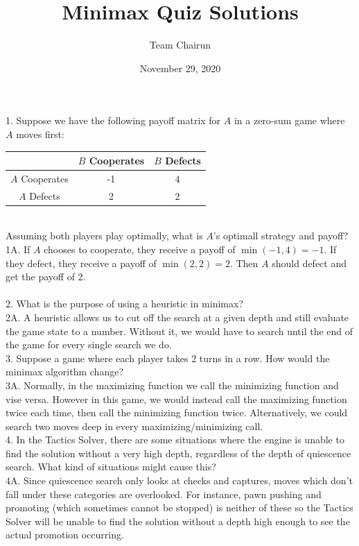 \documentclass[12pt, letterpaper]{article}
\title{Minimax Quiz Solutions}
\author{Team Chairun}
\date{November 29, 2020}
\begin{document}
\maketitle

1. Suppose we have the following payoff matrix for $A$ in a zero-sum game where $A$ moves first: \\
\begin{tabular}{|c|c|c|}
    \hline
    & $B$ Cooperates & $B$ Defects \\
    \hline
    $A$ Cooperates & -1 & 4 \\
    \hline
    $A$ Defects & 2 & 2 \\
    \hline
\end{tabular} \\
Assuming both players play optimally, what is $A$'s optimall strategy and payoff? \\
1A. If $A$ chooses to cooperate, they receive a payoff of $\min(-1, 4) = -1$. If they defect, they receive a payoff of $\min(2, 2) = 2$. Then $A$ should defect and get the payoff of $2$. \\\\
2. What is the purpose of using a heuristic in minimax? \\
2A. A heuristic allows us to cut off the search at a given depth and still evaluate the game state to a number. Without it, we would have to search until the end of the game for every single search we do. \\

3. Suppose a game where each player takes 2 turns in a row. How would the minimax algorithm change? \\
3A. Normally, in the maximizing function we call the minimizing function and vise versa. However in this game, we would instead call the maximizing function twice each time, then call the minimizing function twice. Alternatively, we could search two moves deep in every maximizing/minimizing call. \\

4. In the Tactics Solver, there are some situations where the engine is unable to find the solution without a very high depth, regardless of the depth of quiescence search. What kind of situations might cause this? \\
4A. Since quiescence search only looks at checks and captures, moves which don't fall under these categories are overlooked. For instance, pawn pushing and promoting (which sometimes cannot be stopped) is neither of these so the Tactics Solver will be unable to find the solution without a depth high enough to see the actual promotion occurring. \\
\end{document}
